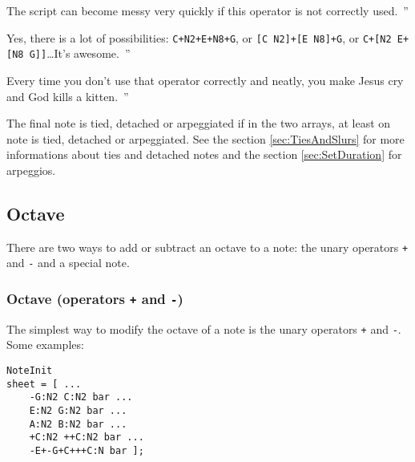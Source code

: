 \documentclass{article}
\newcommand{\wikipedia}{\textsc{Wikipedia}\xspace}
\newcommand{\wiktionary}{\textsc{Wiktionary}\xspace}
\newcommand{\google}{\textsc{Google}\xspace}
\newcommand{\footurl}[1]{\footnote{\url{#1}}\xspace}
\newenvironment{meenv}{ \par \noindent \makebox[6em][r]{ \textcolor{mecolor}{Me}: `` --~}}{~''}
\newenvironment{myselfenv}{ \par \noindent \makebox[6em][r]{ \textcolor{myselfcolor}{Myself}: `` --~}}{~''}
\newcommand{\me}[1]{\begin{meenv}#1\end{meenv}}
\newcommand{\myself}[1]{\begin{myselfenv}#1\end{myselfenv}}
\begin{document}
\myself{The script can become messy very quickly if this operator is not correctly used.}
\me{Yes, there is a lot of possibilities: \lstinline!C+N2+E+N8+G!, or \lstinline![C N2]+[E N8]+G!, or \lstinline!C+[N2 E+[N8 G]]!\dots It's awesome.}
\myself{Every time you don't use that operator correctly and neatly, you make Jesus cry and God kills a kitten.}

The final note is tied, detached or arpeggiated if in the two arrays, at least on note is tied, detached or arpeggiated. See the section \ref{sec:TiesAndSlurs} for more informations about ties and detached notes and the section \ref{sec:SetDuration} for arpeggios.


\subsection{Octave}
\label{sec:Octave}

There are two ways to add or subtract an octave to a note: the unary operators \lstinline!+! and \lstinline!-! and a special note.

\subsubsection{Octave (operators \lstinline!+! and \lstinline!-!)}
\label{sec:OctaveOperators}

The simplest way to modify the octave of a note is the unary operators \lstinline!+! and \lstinline!-!. Some examples: \\

\begin{lstlisting}
NoteInit
sheet = [ ...
	-G:N2 C:N2 bar ...
	E:N2 G:N2 bar ...
	A:N2 B:N2 bar ...
	+C:N2 ++C:N2 bar ...
	-E+-G+C+++C:N bar ];
\end{lstlisting}
\end{document}
